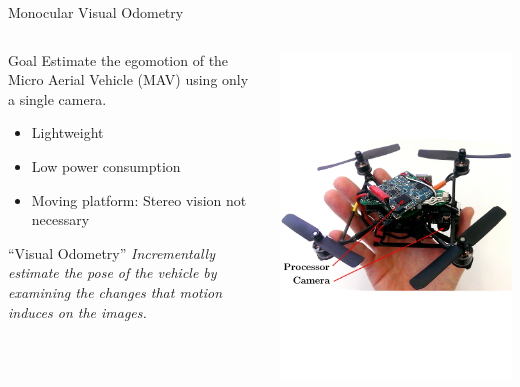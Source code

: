 \documentclass[10pt]{beamer}
\begin{document}
\begin{frame}{Monocular Visual Odometry}
	\begin{columns}
	  \begin{column}{0.4\textwidth}
	  	\begin{block}{Goal}
	  		Estimate the egomotion of the Micro Aerial Vehicle (MAV) using only a single camera.
	  		\begin{itemize}
	  			\item Lightweight
	  			\item Low power consumption
	  			\item Moving platform: Stereo vision not necessary
	  		\end{itemize}
		\end{block}
		\begin{block}{``Visual Odometry''}
			\emph{Incrementally estimate the pose of the vehicle by examining the changes that motion induces on the images.}
		\end{block}
	  \end{column}
	  \begin{column}{0.6\textwidth}
	    \includegraphics[width=\textwidth]{img/nano}
	  \end{column}
	\end{columns}
\end{frame}
\end{document}
